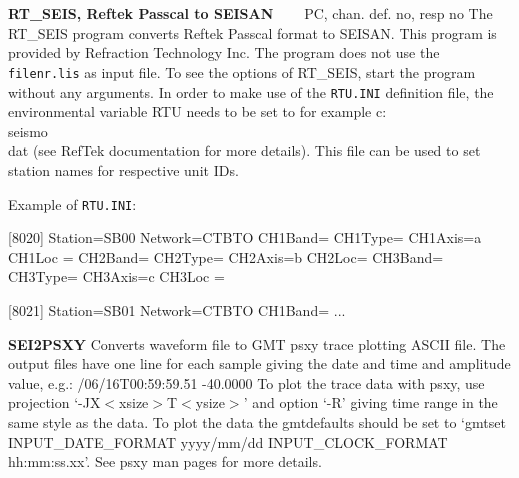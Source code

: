 \textbf{RT\_SEIS, Reftek Passcal to SEISAN} \verb|   | PC, chan. def. no, resp no \newline
The RT\_SEIS program converts Reftek Passcal format to SEISAN. This program is provided by Refraction Technology Inc. The program does not use the \texttt{filenr.lis} as input file. To see the options of RT\_SEIS, start the program without any arguments.  In order to make use of the \texttt{RTU.INI} definition file, the environmental variable RTU needs to be set to for example c:\\seismo\\dat (see RefTek documentation for more details). This file can be used to set station names for respective unit IDs. 

Example of \texttt{RTU.INI}: 

[8020] \newline
Station=SB00 \newline
Network=CTBTO \newline
CH1Band= \newline
CH1Type= \newline
CH1Axis=a \newline
CH1Loc = \newline
CH2Band= \newline
CH2Type= \newline
CH2Axis=b \newline
CH2Loc= \newline
CH3Band= \newline
CH3Type= \newline
CH3Axis=c \newline
CH3Loc = 

[8021] \newline
Station=SB01 \newline
Network=CTBTO \newline
CH1Band= \newline
... 

\textbf{SEI2PSXY} \newline
Converts waveform file to GMT psxy trace plotting ASCII file. The 
output files have one line for each sample giving the date and time 
and amplitude value, e.g.:  /06/16T00:59:59.51 -40.0000  \newline
To plot the trace data with psxy, use projection `-JX$<$xsize$>$T$<$ysize$>$' and option `-R' giving time range in the same style as the data. To plot the data the gmtdefaults should be set to `gmtset INPUT\_DATE\_FORMAT yyyy/mm/dd INPUT\_CLOCK\_FORMAT hh:mm:ss.xx'. See psxy man pages for more details. 

